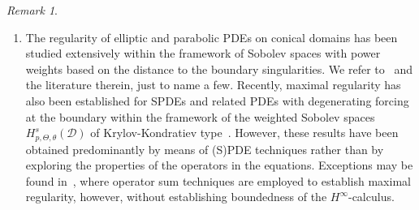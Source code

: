 \documentclass[12pt,a4paper, reqno]{amsart}
\theoremstyle{plain}
\theoremstyle{definition}
\theoremstyle{remark}
\newtheorem{remark}[theorem]{Remark}
\numberwithin{equation}{section}
\newcommand{\1}{\mathbbm{1}}
\newcommand{\calD}{\ensuremath{\mathcal{D}}}
\begin{document}
\begin{remark}\label{rem:main:thm:maxReg}~
\begin{enumerate}[\textup{(\roman*)}]
\item\label{it:rem:main:maxreg}
The regularity of elliptic and parabolic PDEs on conical domains has been studied extensively within the framework of Sobolev spaces with power weights based on the distance to the boundary singularities. We refer to~\cite{Dau1988,KozMazRos1997,Sol2001,Nazarov2001,BorKon2006,MazRos2010,Kozlov2014TheDP} and the literature therein, just to name a few.
Recently, maximal regularity has also been established for SPDEs and related PDEs with degenerating forcing at the boundary within the framework of the weighted Sobolev spaces $H^s_{p,\Theta,\theta}(\calD)$ of Krylov-Kondratiev type~\cite{CioKimKyeLeeLin2018,CioKimLee2019,Cio20,KimLeeSeo2021,KimLeeSeo2022b,cioicalicht2024sobolevspacesmixedweights}. 
However, these results have been obtained predominantly by means of 
(S)PDE techniques rather than by exploring the properties of the operators in the equations.
Exceptions may be found in~\cite{Prss2007HinftycalculusFT,KoehneSaalWestermann2021,koehne2024optimalregularitystokesequations}, where operator sum techniques are employed to establish maximal regularity, however, without establishing boundedness of the $H^\infty$-calculus.


\end{enumerate}
\end{remark}
\end{document}
